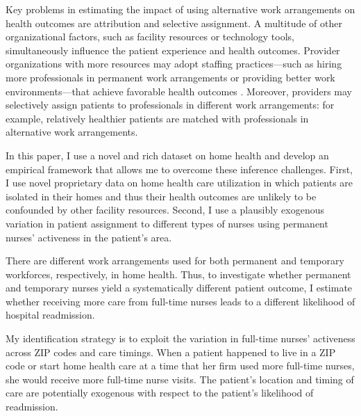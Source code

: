 \documentclass[final,12pt]{article}
\begin{document}
Key problems in estimating the impact of using alternative work arrangements on health outcomes are attribution and selective assignment.
A multitude of other organizational factors, such as facility resources or technology tools, simultaneously influence the patient experience and health outcomes. Provider organizations with more resources may adopt staffing practices---such as hiring more professionals in permanent work arrangements or providing better work environments---that achieve favorable health outcomes \citep{Aiken2007}.
Moreover, providers may selectively assign patients to professionals in different work arrangements: for example, relatively healthier patients are matched with professionals in alternative work arrangements.

In this paper, I use a novel and rich dataset on home health and develop an empirical framework that allows me to overcome these inference challenges.
First, I use novel proprietary data on home health care utilization in which patients are isolated in their homes and thus their health outcomes are unlikely to be confounded by other facility resources.
Second, I use a plausibly exogenous variation in patient assignment to different types of nurses using permanent nurses' activeness in the patient's area.

There are different work arrangements used for both permanent and temporary workforces, respectively, in home health. Thus, to investigate whether permanent and temporary nurses yield a systematically different patient outcome, I estimate whether receiving more care from full-time nurses leads to a different likelihood of hospital readmission.

My identification strategy is to exploit the variation in full-time nurses' activeness across ZIP codes and care timings.
When a patient happened to live in a ZIP code or start home health care at a time that her firm used more full-time nurses, she would receive more full-time nurse visits. The patient's location and timing of care are potentially exogenous with respect to the patient's likelihood of readmission.
\end{document}
